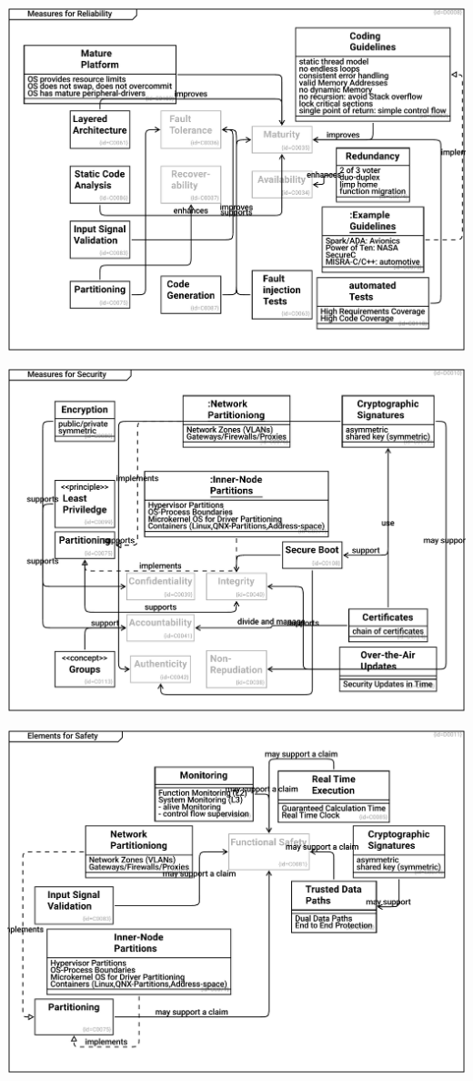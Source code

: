 \documentclass{article}
\begin{document}
\includegraphics[width= 1.0\linewidth]{quality_export/D0008_Measures_for_Reliability.pdf}


\includegraphics[width= 1.0\linewidth]{quality_export/D0010_Measures_for_Security.pdf}


\includegraphics[width= 1.0\linewidth]{quality_export/D0011_Elements_for_Safety.pdf}

\end{document}
